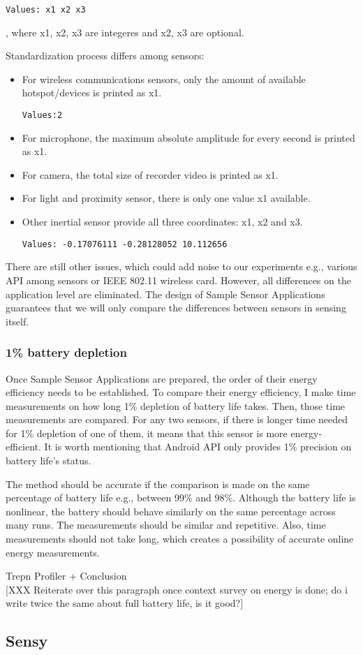 \begin{lstlisting}[frame=single]
Values: x1 x2 x3
\end{lstlisting}, where x1, x2, x3 are integeres and x2, x3 are optional. 

Standardization process differs among sensors:
\begin{itemize}
	\item For wireless communications sensors, only the amount of available hotspot/devices is printed as x1. 
		\begin{lstlisting}[frame=single]
Values:2
		\end{lstlisting}
	\item For microphone, the maximum absolute amplitude for every second is printed as x1.
	\item For camera, the total size of recorder video is printed as x1.
	\item For light and proximity sensor, there is only one value x1 available.
	\item Other inertial sensor provide all three coordinates: x1, x2 and x3.
		\begin{lstlisting}[frame=single]
Values: -0.17076111 -0.28128052 10.112656
		\end{lstlisting}
\end{itemize}

There are still other issues, which could add noise to our experiments e.g., various API among sensors or IEEE 802.11 wireless card. However, all differences on the application level are eliminated. The design of Sample Sensor Applications guarantees that we will only compare the differences between sensors in sensing itself.
				
\subsubsection{1\% battery depletion}	
\label{s:design:measurements:method}
Once  Sample Sensor Applications are prepared, the order of their energy efficiency needs to be established. To compare their energy efficiency, I make time measurements on how long 1\% depletion of battery life takes. Then, those time measurements are compared. For any two sensors, if there is longer time needed for 1\% depletion of one of them, it means that this sensor is more energy-efficient. It is worth mentioning that Android API only provides 1\% precision on battery life's status. 

The method should be accurate if the comparison is made on the same percentage of battery life e.g., between 99\% and 98\%. Although the battery life is nonlinear, the battery should behave similarly on the same percentage across many runs. The measurements should be similar and repetitive. Also, time measurements should not take long, which creates a possibility of accurate online energy measurements. 

Trepn Profiler + Conclusion\\

[XXX Reiterate over this paragraph once context survey on energy is done;
	do i write twice the same about full battery life, is it good?]			
			
		
		
		
\subsection{Sensy}
\label{s:design:sensy}

